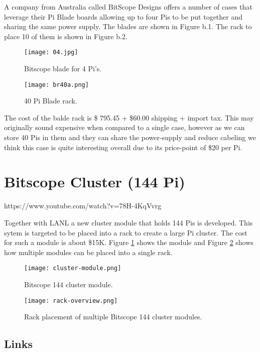 A company from Australia called BitScope Designs offers a number of
cases that leverage their Pi Blade boards allowing up to four Pis to be
put together and sharing the same power supply. The blades are shown in
Figure b.1. The rack to place 10 of them is shown in Figure b.2.

\begin{figure}
\centering
\texttt{[image: 04.jpg]}
\caption{Bitscope blade for 4 Pi's.}
\end{figure}


\begin{figure}
\centering
\texttt{[image: br40a.png]}
\caption{40 Pi Blade rack.}
\end{figure}


The cost of the balde rack is \$ 795.45 + \$60.00 shipping + import tax.
This may originally sound expensive when compared to a single case,
however as we can store 40 Pis in them and they can share the
power-supply and reduce cabeling we think this case is quite interesting
overall due to its price-point of \$20 per Pi.



\section{Bitscope Cluster (144 Pi)}\label{bitscope-cluster-144-pi}

https://www.youtube.com/watch?v=78H-4KqVvrg

Together with LANL a new cluster module that holds 144 Pis is developed.
This sytem is targeted to be placed into a rack to create a large Pi
cluster. The cost for such a module is about \$15K. Figure
\ref{F:pi-mod-1} shows the
module and Figure \ref{F:pi-mod-2} shows how multiple modules can be placed into a
single rack.

\begin{figure}
\centering
\texttt{[image: cluster-module.png]}
\caption{Bitscope 144 cluster module.}\label{F:pi-mod-1}
\end{figure}

\begin{figure}
\centering
\texttt{[image: rack-overview.png]}
\caption{Rack placement of multiple Bitscope 144 cluster modules.}\label{F:pi-mod-2}
\end{figure}




\subsection{Links}\label{links}

